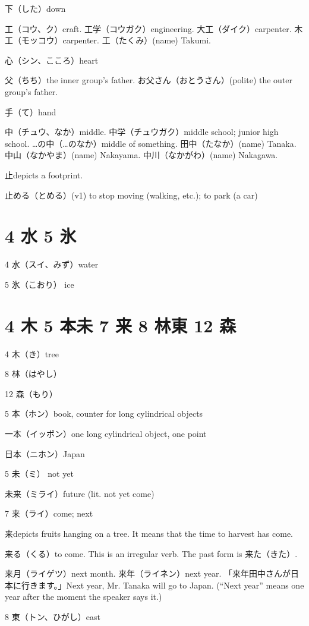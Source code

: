 下（した）down

工（コウ、ク）craft.
工学（コウガク）engineering.
大工（ダイク）carpenter.
木工（モッコウ）carpenter.
工（たくみ）(name) Takumi.

心（シン、こころ）heart

父（ちち）the inner group's father.
お父さん（おとうさん）(polite) the outer group's father.

手（て）hand

中（チュウ、なか）middle.
中学（チュウガク）middle school; junior high school.
…の中（…のなか）middle of something.
田中（たなか）(name) Tanaka.
中山（なかやま）(name) Nakayama.
中川（なかがわ）(name) Nakagawa.

止depicts a footprint.

止める（とめる）(v1) to stop moving (walking, etc.); to park (a car)

\section{4 水 5 氷}

4 水（スイ、みず）water

5 氷（こおり） ice

\section{4 木 5 本未 7 来 8 林東 12 森}

4 木（き）tree

8 林（はやし）

12 森（もり）

5 本（ホン）book, counter for long cylindrical objects

一本（イッポン）one long cylindrical object, one point

日本（ニホン）Japan

5 未（ミ） not yet

未来（ミライ）future (lit. not yet come)

7 来（ライ）come; next

来depicts fruits hanging on a tree.
It means that the time to harvest has come.

来る（くる）to come. This is an irregular verb. The past form is 来た（きた）.

来月（ライゲツ）next month.
来年（ライネン）next year.
「来年田中さんが日本に行きます。」Next year, Mr. Tanaka will go to Japan.
(``Next year'' means one year after the moment the speaker says it.)

8 東（トン、ひがし）east

